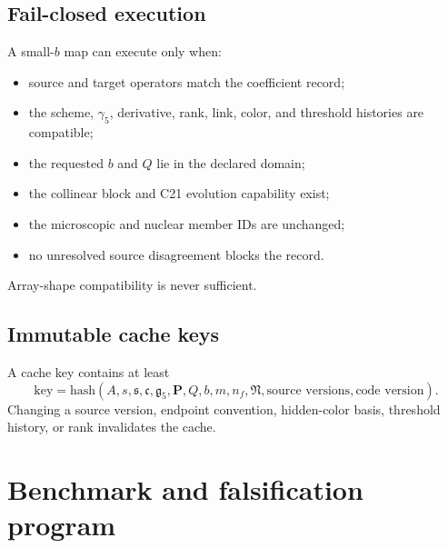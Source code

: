 \documentclass[11pt]{article}
\begin{document}
\subsection{Fail-closed execution}

A small-\(b\) map can execute only when:
\begin{itemize}
\item source and target operators match the coefficient record;
\item the scheme, \(\gamma_5\), derivative, rank, link, color, and threshold histories are compatible;
\item the requested \(b\) and \(Q\) lie in the declared domain;
\item the collinear block and C21 evolution capability exist;
\item the microscopic and nuclear member IDs are unchanged;
\item no unresolved source disagreement blocks the record.
\end{itemize}
Array-shape compatibility is never sufficient.

\subsection{Immutable cache keys}

A cache key contains at least
\begin{equation}
 \mathrm{key}=\mathrm{hash}
 \left(
 A,s,\mathfrak s,\mathfrak c,\mathfrak g_5,
 \bm P,Q,b,m,n_f,\mathfrak N,
 \text{source versions},\text{code version}
 \right).
 \label{eq:cache-key}
\end{equation}
Changing a source version, endpoint convention, hidden-color basis, threshold history, or rank invalidates the cache.

\section{Benchmark and falsification program}
\label{sec:benchmarks}
\end{document}
